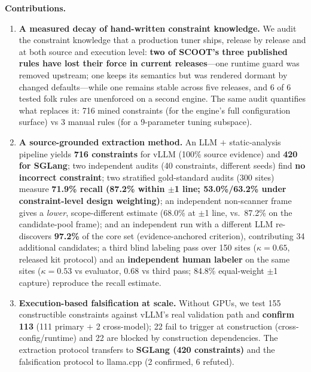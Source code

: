 \documentclass[journal]{IEEEtran}
\begin{document}
\textbf{Contributions.}
\begin{enumerate}
  \item \textbf{A measured decay of hand-written constraint knowledge.} We audit the constraint knowledge that a production tuner ships, release by release and at both source and execution level: \textbf{two of SCOOT's three published rules have lost their force in current releases}---one runtime guard was removed upstream; one keeps its semantics but was rendered dormant by changed defaults---while one remains stable across five releases, and 6 of 6 tested folk rules are unenforced on a second engine. The same audit quantifies what replaces it: 716 mined constraints (for the engine's full configuration surface) vs 3 manual rules (for a 9-parameter tuning subspace).
  \item \textbf{A source-grounded extraction method.} An LLM $+$ static-analysis pipeline yields \textbf{716 constraints} for vLLM (100\% source evidence) and \textbf{420 for SGLang}; two independent audits (40 constraints, different seeds) find \textbf{no incorrect constraint}; two stratified gold-standard audits (300 sites) measure \textbf{71.9\% recall (87.2\% within $\pm$1 line; 53.0\%/63.2\% under constraint-level design weighting)}; an independent non-scanner frame gives a \emph{lower}, scope-different estimate (68.0\% at $\pm$1 line, vs.\ 87.2\% on the candidate-pool frame); and an independent run with a different LLM re-discovers \textbf{97.2\%} of the core set (evidence-anchored criterion), contributing 34 additional candidates; a third blind labeling pass over 150 sites ($\kappa = 0.65$, released kit protocol) and an \textbf{independent human labeler} on the same sites ($\kappa = 0.53$ vs evaluator, 0.68 vs third pass; 84.8\% equal-weight $\pm$1 capture) reproduce the recall estimate.
  \item \textbf{Execution-based falsification at scale.} Without GPUs, we test 155 constructible constraints against vLLM's real validation path and \textbf{confirm 113} (111 primary $+$ 2 cross-model); 22 fail to trigger at construction (cross-config/runtime) and 22 are blocked by construction dependencies. The extraction protocol transfers to \textbf{SGLang (420 constraints)} and the falsification protocol to llama.cpp (2 confirmed, 6 refuted).

\end{enumerate}
\end{document}
